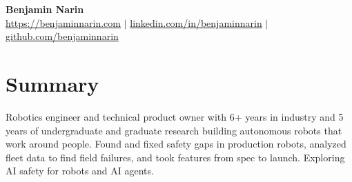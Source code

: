 \documentclass[letterpaper,10pt]{article}
\begin{document}
\begin{center}
  \textbf{\LARGE Benjamin Narin} \\
  \vspace{5pt}
  \href{https://benjaminnarin.com}{https://benjaminnarin.com} $|$
  \href{https://linkedin.com/in/benjaminnarin}{linkedin.com/in/benjaminnarin} $|$
  \href{https://github.com/benjaminnarin}{github.com/benjaminnarin}
\end{center}

\section*{Summary}
Robotics engineer and technical product owner with 6+ years in industry and 5 years of undergraduate and graduate research building autonomous robots that work around people. Found and fixed safety gaps in production robots, analyzed fleet data to find field failures, and took features from spec to launch. Exploring AI safety for robots and AI agents.
\end{document}
